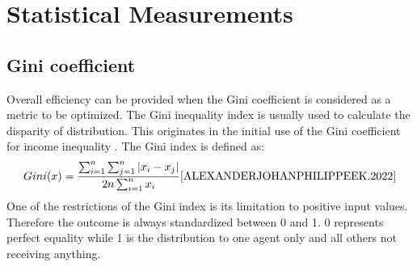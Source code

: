 \documentclass[german, a4paper, 11pt, oneside]{scrbook}
\begin{document}
\section{Statistical Measurements}
\subsection{Gini coefficient}
Overall efficiency can be provided when the Gini coefficient is considered as a metric to be optimized. The Gini inequality index is usually used to calculate the disparity of distribution. This originates in the initial use of the Gini coefficient for income inequality \cite{ALEXANDERJOHANPHILIPPEEK.2022}. 
The Gini index is defined as: 
\[
  Gini(x) = \frac{\sum_{i=1}^n \sum_{j=1}^n | x_i - x_j| }{2 n \sum_{i=1}^n x_i} \cite{ALEXANDERJOHANPHILIPPEEK.2022}
\]
One of the restrictions of the Gini index is its limitation to positive input values. Therefore the outcome is always standardized between 0 and 1. \cite{ALEXANDERJOHANPHILIPPEEK.2022} 0 represents perfect equality while 1 is the distribution to one agent only and all others not receiving anything.
\end{document}
